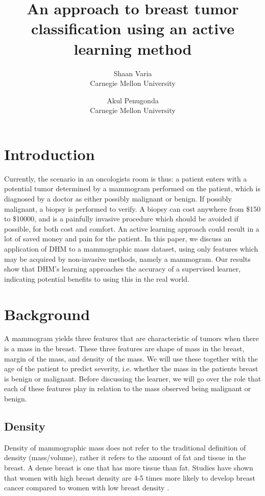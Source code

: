 \documentclass[12pt]{article}
\title{An approach to breast tumor classification using an active learning method}
\author{Shaan Varia \\ Carnegie Mellon University \and Akul Penugonda \\ Carnegie Mellon University}
\begin{document}
\maketitle

\section{Introduction}

Currently, the scenario in an oncologists room is thus: a patient enters with a potential tumor determined by a mammogram performed on the patient, which is diagnosed by a doctor as either possibly malignant or benign. If possibly malignant, a biopsy is performed to verify. A biopsy can cost anywhere from \$150 to \$10000, and is a painfully invasive procedure which should be avoided if possible, for both cost and comfort. An active learning approach could result in a lot of saved money and pain for the patient. In this paper, we discuss an application of DHM to a mammographic mass dataset, using only features which may be acquired by non-invasive methods, namely a mammogram.  Our results show that DHM's learning approaches the accuracy of a supervised learner, indicating potential benefits to using this in the real world.

\section{Background}

A mammogram yields three features that are characteristic of tumors when there is a mass in the breast. These three features are shape of mass in the breast, margin of the mass, and density of the mass. We will use these together with the age of the patient to predict severity, i.e. whether the mass in the patients breast is benign or malignant. Before discussing the learner, we will go over the role that each of these features play in relation to the mass observed being malignant or benign.

\subsection{Density}

Density of mammographic mass does not refer to the traditional definition of density (mass/volume), rather it refers to the amount of fat and tissue in the breast. A dense breast is one that has more tissue than fat. Studies have shown that women with high breast density are 4-5 times more likely to develop breast cancer compared to women with low breast density \cite{boyd, white}. 
\end{document}
